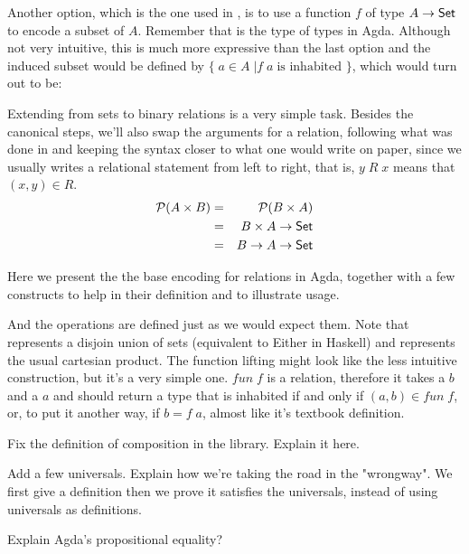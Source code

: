 Another option, which is the one used in \cite{Jansson09}, is to use a function $f$
of type $A \rightarrow \D{Set}$ to encode a subset of $A$. Remember that  is
the type of types in Agda. Although not very intuitive, this is much more expressive than the 
last option and the induced subset would be defined by $\{\; a \in A\; | f\;a\;\text{is inhabited }\}$,
which would turn out to be:


Extending from sets to binary relations is a very simple task. Besides the canonical steps,
we'll also swap the arguments for a relation, following what was done in \cite{Jansson09} and
keeping the syntax closer to what one would write on paper, since we usually writes a relational
statement from left to right, that is, $y\;R\;x$ means that $(x, y) \in R$.
\begin{eqnarray*}
  \powerset (A \times B) & = & \powerset (B \times A)\\
                         & = & B \times A \rightarrow \D{Set}\\
                         & = & B \rightarrow A \rightarrow \D{Set}
\end{eqnarray*}

Here we present the the base encoding for relations in Agda, together with a few constructs
to help in their definition and to illustrate usage.


And the operations are defined just as we would expect them. Note that  represents a disjoin union of sets
(equivalent to Either in Haskell) and  represents the usual cartesian product. The function
lifting might look like the less intuitive construction, but it's a very simple one. $fun\;f$ is a relation,
therefore it takes a $b$ and a $a$ and should return a type that is inhabited if and only if $(a, b) \in fun\;f$,
or, to put it another way, if $b = f\;a$, almost like it's textbook definition.

\begin{TODO}
  \item Fix the definition of composition in the library. Explain it here.
  \item Add a few universals. Explain how we're taking the road in the "wrongway".
        We first give a definition then we prove it satisfies the universals, instead
        of using universals as definitions.
  \item Explain Agda's propositional equality?
\end{TODO}

